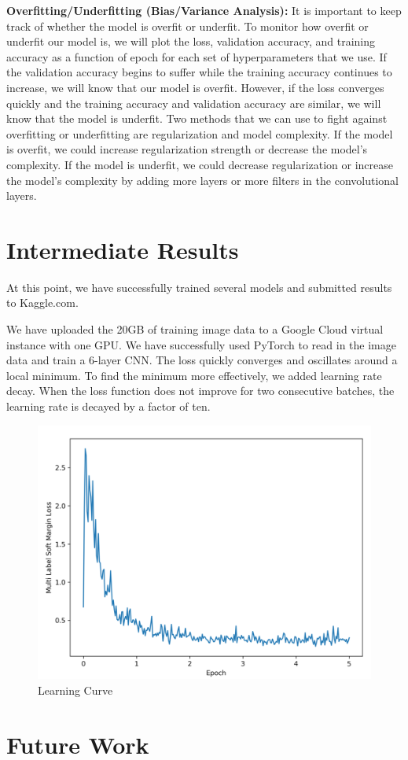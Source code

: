 \documentclass[10pt,twocolumn,letterpaper]{article}
\begin{document}
\textbf{Overfitting/Underfitting (Bias/Variance Analysis):} It is important to keep track of whether the model is overfit or underfit. To monitor how overfit or underfit our model is, we will plot the loss, validation accuracy, and training accuracy as a function of epoch for each set of hyperparameters that we use. If the validation accuracy begins to suffer while the training accuracy continues to increase, we will know that our model is overfit. However, if the loss converges quickly and the training accuracy and validation accuracy are similar, we will know that the model is underfit. Two methods that we can use to fight against overfitting or underfitting are regularization and model complexity. If the model is overfit, we could increase regularization strength or decrease the model's complexity. If the model is underfit, we could decrease regularization or increase the model's complexity by adding more layers or more filters in the convolutional layers.




\section{Intermediate Results}
At this point, we have successfully trained several models and submitted results to Kaggle.com.

We have uploaded the 20GB of training image data to a Google Cloud virtual instance with one GPU. We have successfully used PyTorch to read in the image data and train a 6-layer CNN. The loss quickly converges and oscillates around a local minimum. To find the minimum more effectively, we added learning rate decay. When the loss function does not improve for two consecutive batches, the learning rate is decayed by a factor of ten.


\begin{figure}
    \includegraphics[width=\columnwidth]{LossCurve.png}
    \caption{Learning Curve}
\end{figure}


\section{Future Work}



{\small


}
\end{document}
